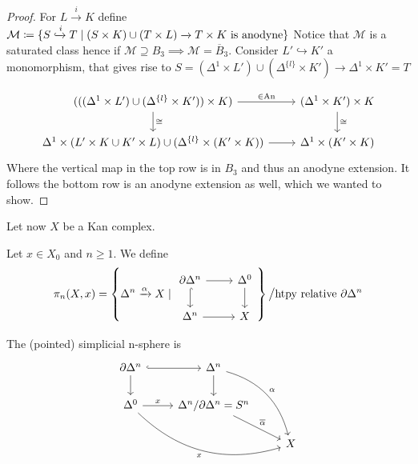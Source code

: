 \begin{proof}
    For 
    $ L \xrightarrow{i} K$ define $\mathcal{M} \coloneqq \{ S \xhookrightarrow{i} T \mid (S \times K) \cup (T \times L) \xrightarrow{} T \times K \text{ is anodyne}\}$
    Notice that $\mathcal{M}$ is a saturated class 
    hence if $\mathcal{M} \supseteq B_3 \implies \mathcal{M} = \overline{B}_3$.
    Consider $L' \hookrightarrow K'$ a monomorphism, that gives rise to $S = ( \Delta^1 \times L') \cup ( \Delta^{\{l\}} \times K') \to \Delta^1 \times K'= T$
    
    \[
    \begin{tikzcd}
        (((\Delta^1 \times L') \cup ( \Delta^{\{l\}} \times K')) \times K ) 
        \ar[r, " \in \An"]
        \ar[d, "\cong"]
        &
        (\Delta^1 \times K') \times K 
        \ar[d,"\cong"]
        \\
        \Delta^1 \times ( L' \times K \cup K' \times L) \cup ( \Delta^{\{l\}} \times (K' \times K) )
        \ar[r]
        &
        \Delta^1 \times (K' \times K)
    \end{tikzcd}
    \]
    Where the vertical map in the top row is in $B_3$ and thus an anodyne extension.
    It follows the bottom row is an anodyne extension as well, which we wanted to show.
\end{proof}

Let now $X$ be a Kan complex.

\begin{defi}
    Let $x \in X_0$ and $ n \geq 1$. We define 
    \[
    \pi_n(X,x) = \left\{ \Delta^n \xrightarrow{\alpha} X \mid 
    \begin{tikzcd}
        \partial
        \Delta^n
        \ar[r]
        \ar[d, hook]
        &
        \Delta^0
        \ar[d]
        \\
        \Delta^n
        \ar[r]
        &
        X
    \end{tikzcd}
    \right\}
    \big/ \text{htpy relative }\partial\Delta^n 
    \]
\end{defi}

\begin{defi}
\label{simplicial n-sphere}
    The (pointed) simplicial n-sphere is 
    \[
    \begin{tikzcd}
        \partial
        \Delta^n
        \ar[d]
        \ar[r, hook]
        &
        \Delta^n
        \ar[rdd, bend left, "\alpha"]
        \ar[d]
        \\
        \Delta^0
        \ar[r, "x"]
        \ar[drr, bend right, "x"']
        &
        \Delta^n/\partial \Delta^n = S^n
        \ar[rd, "\overline{\alpha}"]       
        \\
        &&
        X
    \end{tikzcd}
    \]
\end{defi}

